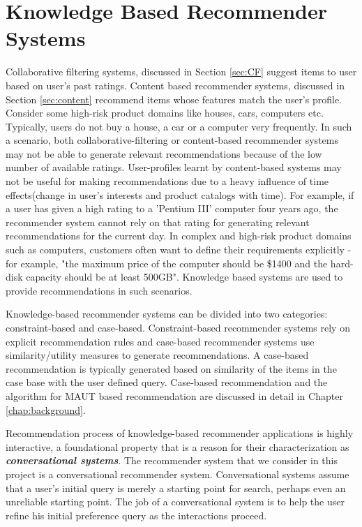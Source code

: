 \section{Knowledge Based Recommender Systems}
Collaborative filtering systems, discussed in Section \ref{sec:CF} suggest items to user based on user's past ratings.
Content based recommender systems, discussed in Section \ref{sec:content} recommend items whose features match the user's profile.
Consider some high-risk product domains like houses, cars, computers etc.
Typically, users do not buy a house, a car or a computer very frequently. 
In such a scenario, both collaborative-filtering or content-based recommender systems may not be able to generate relevant recommendations because of the low number of available ratings.
User-profiles learnt by content-based systems may not be useful for making recommendations due to a heavy influence of time effects(change in user's interests and product catalogs with time). 
For example, if a user has given a high rating to a 'Pentium III' computer four years ago, the recommender system cannot rely on that rating for generating relevant recommendations for the current day.
In complex and high-risk product domains such as computers, customers often want to define their requirements explicitly - for example, "the maximum price of the computer should be \$1400 and the hard-disk capacity should be at least 500GB".
Knowledge based systems are used to provide recommendations in such scenarios.

Knowledge-based recommender systems can be divided into two categories: constraint-based and case-based.
Constraint-based recommender systems rely on explicit recommendation rules and case-based recommender systems use similarity/utility measures to generate recommendations. 
A case-based recommendation is typically generated based on similarity of the items in the case base with the user defined query.
Case-based recommendation and the algorithm for MAUT based recommendation are discussed in detail in Chapter \ref{chap:background}.

Recommendation process of knowledge-based recommender applications is highly interactive, a foundational property that is a reason for their characterization as \textit{\textbf{conversational systems}}. The recommender system that we consider in this project is a conversational recommender system.
Conversational systems assume that a user's initial query is merely a starting point for search, perhaps even an unreliable starting point. The job of a conversational system is to help the user refine his initial preference query as the interactions proceed.
